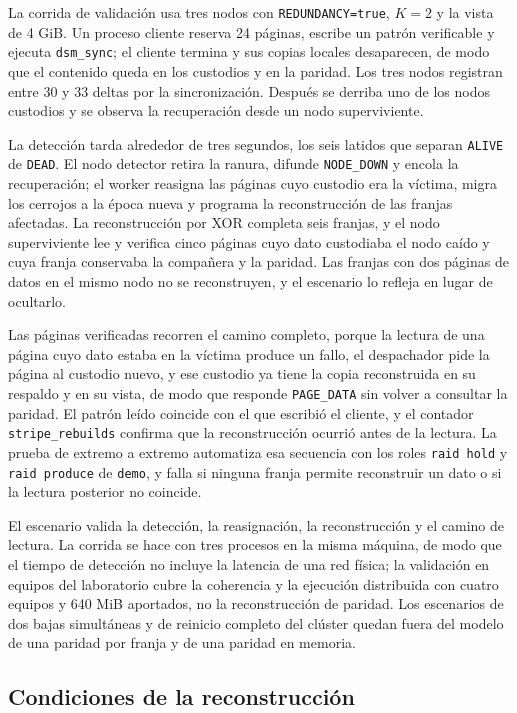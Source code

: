 La corrida de validación usa tres nodos con \texttt{REDUNDANCY=true}, $K=2$ y la vista de 4 GiB. Un proceso cliente reserva 24 páginas, escribe un patrón verificable y ejecuta \texttt{dsm\_sync}; el cliente termina y sus copias locales desaparecen, de modo que el contenido queda en los custodios y en la paridad. Los tres nodos registran entre 30 y 33 deltas por la sincronización. Después se derriba uno de los nodos custodios y se observa la recuperación desde un nodo superviviente.

La detección tarda alrededor de tres segundos, los seis latidos que separan \texttt{ALIVE} de \texttt{DEAD}. El nodo detector retira la ranura, difunde \texttt{NODE\_DOWN} y encola la recuperación; el worker reasigna las páginas cuyo custodio era la víctima, migra los cerrojos a la época nueva y programa la reconstrucción de las franjas afectadas. La reconstrucción por XOR completa seis franjas, y el nodo superviviente lee y verifica cinco páginas cuyo dato custodiaba el nodo caído y cuya franja conservaba la compañera y la paridad. Las franjas con dos páginas de datos en el mismo nodo no se reconstruyen, y el escenario lo refleja en lugar de ocultarlo.

Las páginas verificadas recorren el camino completo, porque la lectura de una página cuyo dato estaba en la víctima produce un fallo, el despachador pide la página al custodio nuevo, y ese custodio ya tiene la copia reconstruida en su respaldo y en su vista, de modo que responde \texttt{PAGE\_DATA} sin volver a consultar la paridad. El patrón leído coincide con el que escribió el cliente, y el contador \texttt{stripe\_rebuilds} confirma que la reconstrucción ocurrió antes de la lectura. La prueba de extremo a extremo automatiza esa secuencia con los roles \texttt{raid hold} y \texttt{raid produce} de \texttt{demo}, y falla si ninguna franja permite reconstruir un dato o si la lectura posterior no coincide.

El escenario valida la detección, la reasignación, la reconstrucción y el camino de lectura. La corrida se hace con tres procesos en la misma máquina, de modo que el tiempo de detección no incluye la latencia de una red física; la validación en equipos del laboratorio cubre la coherencia y la ejecución distribuida con cuatro equipos y 640 MiB aportados, no la reconstrucción de paridad. Los escenarios de dos bajas simultáneas y de reinicio completo del clúster quedan fuera del modelo de una paridad por franja y de una paridad en memoria.

\subsection{Condiciones de la reconstrucción}

